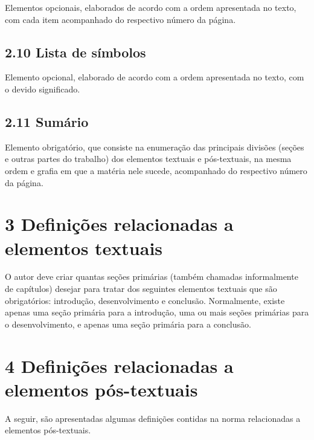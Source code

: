 \documentclass[
	12pt,				%
	oneside,			%
	a4paper,			%
	english,			%
	brazil				%
	]{abntex2ppgsi}
\begin{document}
\begin{anexosenv}
Elementos opcionais, elaborados de acordo com a ordem apresentada no texto, com cada item acompanhado do respectivo número da página.



\subsection*{2.10 Lista de símbolos}

Elemento opcional, elaborado de acordo com a ordem apresentada no texto, com o devido significado.

\subsection*{2.11 Sumário}

Elemento obrigatório, que consiste na enumeração das principais divisões (seções e outras partes do trabalho) dos elementos textuais e pós-textuais, na mesma ordem e grafia em que a matéria nele sucede, acompanhado do respectivo número da página.

\section*{3 Definições relacionadas a elementos textuais}

O autor deve criar quantas seções primárias (também chamadas informalmente de capítulos) desejar para tratar dos seguintes elementos textuais que são obrigatórios: introdução, desenvolvimento e conclusão. Normalmente, existe apenas uma seção primária para a introdução, uma ou mais seções primárias para o desenvolvimento, e apenas uma seção primária para a conclusão.

\section*{4 Definições relacionadas a elementos pós-textuais}

A seguir, são apresentadas algumas definições contidas na norma relacionadas a elementos pós-textuais.


\end{anexosenv}
\end{document}
